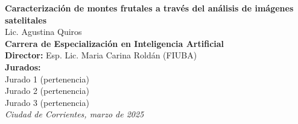 \begin{titlepage}

    \begin{flushright}
        \setlength{\rightskip}{-2cm} %
        \vspace*{7.5cm} %

        {\bfseries\fontsize{33pt}{40pt}\selectfont
        Caracterización de montes frutales a través del análisis de imágenes satelitales} \\[1.5cm]

        {\fontsize{20pt}{25pt}\selectfont
        Lic. Agustina Quiros} \\[1cm]

        {\fontsize{15pt}{20pt}\selectfont
        \textbf{Carrera de Especialización en Inteligencia Artificial}
        } \\[2cm]

        {\fontsize{11pt}{15pt}\selectfont
        \textbf{Director:} Esp. Lic. Maria Carina Roldán (FIUBA)} \\[1cm]

        {\fontsize{11pt}{15pt}\selectfont
        \textbf{Jurados:}} \\[0.5cm]
        {\fontsize{11pt}{15pt}\selectfont
        Jurado 1 (pertenencia)} \\ 
        {\fontsize{11pt}{15pt}\selectfont
        Jurado 2 (pertenencia)} \\ 
        {\fontsize{11pt}{15pt}\selectfont
        Jurado 3 (pertenencia)} \\[2cm]

        {\itshape\fontsize{10pt}{12pt}\selectfont
        Ciudad de Corrientes, marzo de 2025} %
    \end{flushright}
\end{titlepage}
